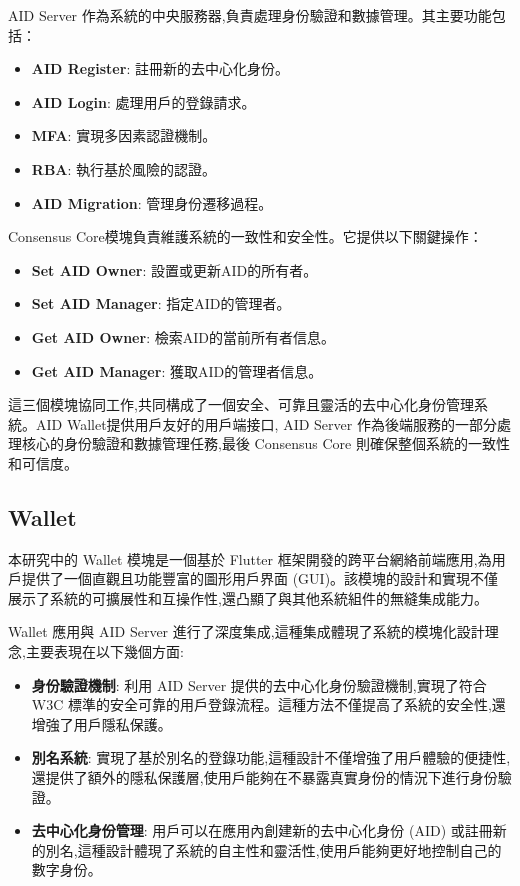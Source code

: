 AID Server 作為系統的中央服務器,負責處理身份驗證和數據管理。其主要功能包括：

\begin{itemize}
  \item \textbf{AID Register}: 註冊新的去中心化身份。
  \item \textbf{AID Login}: 處理用戶的登錄請求。
  \item \textbf{MFA}: 實現多因素認證機制。
  \item \textbf{RBA}: 執行基於風險的認證。
  \item \textbf{AID Migration}: 管理身份遷移過程。
\end{itemize}

Consensus Core模塊負責維護系統的一致性和安全性。它提供以下關鍵操作：

\begin{itemize}
  \item \textbf{Set AID Owner}: 設置或更新AID的所有者。
  \item \textbf{Set AID Manager}: 指定AID的管理者。
  \item \textbf{Get AID Owner}: 檢索AID的當前所有者信息。
  \item \textbf{Get AID Manager}: 獲取AID的管理者信息。
\end{itemize}

這三個模塊協同工作,共同構成了一個安全、可靠且靈活的去中心化身份管理系統。AID Wallet提供用戶友好的用戶端接口, AID Server 作為後端服務的一部分處理核心的身份驗證和數據管理任務,最後 Consensus Core 則確保整個系統的一致性和可信度。

\subsection{Wallet}

本研究中的 Wallet 模塊是一個基於 Flutter 框架開發的跨平台網絡前端應用,為用戶提供了一個直觀且功能豐富的圖形用戶界面 (GUI)。該模塊的設計和實現不僅展示了系統的可擴展性和互操作性,還凸顯了與其他系統組件的無縫集成能力。

Wallet 應用與 AID Server 進行了深度集成,這種集成體現了系統的模塊化設計理念,主要表現在以下幾個方面:

\begin{itemize}
  \item \textbf{身份驗證機制}: 利用 AID Server 提供的去中心化身份驗證機制,實現了符合 W3C 標準的安全可靠的用戶登錄流程。這種方法不僅提高了系統的安全性,還增強了用戶隱私保護。
  \item \textbf{別名系統}: 實現了基於別名的登錄功能,這種設計不僅增強了用戶體驗的便捷性,還提供了額外的隱私保護層,使用戶能夠在不暴露真實身份的情況下進行身份驗證。
  \item \textbf{去中心化身份管理}: 用戶可以在應用內創建新的去中心化身份 (AID) 或註冊新的別名,這種設計體現了系統的自主性和靈活性,使用戶能夠更好地控制自己的數字身份。
\end{itemize}

